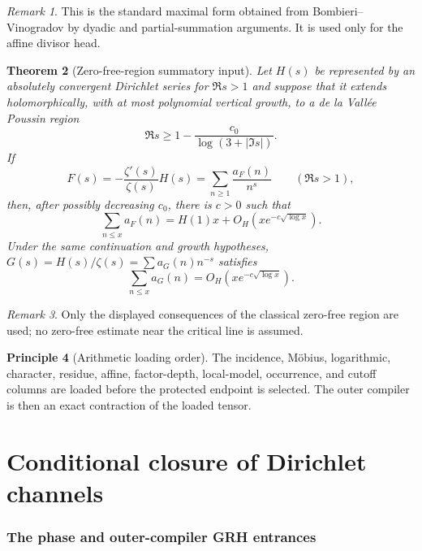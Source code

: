 \documentclass[11pt]{article}
\newtheorem{theorem}{Theorem}[section]
\theoremstyle{definition}
\newtheorem{principle}[theorem]{Principle}
\theoremstyle{remark}
\newtheorem{remark}[theorem]{Remark}
\begin{document}
\begin{remark}
This is the standard maximal form obtained from Bombieri--Vinogradov \cite{Bombieri1965,Vinogradov,IK} by dyadic
and partial-summation arguments.  It is used only for the affine divisor head.
\end{remark}

\begin{theorem}[Zero-free-region summatory input]
\label{thm:zero-free-input}
Let $H(s)$ be represented by an absolutely convergent Dirichlet series for
$\Re s>1$ and suppose that it extends holomorphically, with at most polynomial
vertical growth, to a de la Vall\'ee Poussin region
\[
 \Re s\ge 1-\frac{c_0}{\log(3+|\Im s|)}.
\]
If
\[
 F(s)=-\frac{\zeta'(s)}{\zeta(s)}H(s)
      =\sum_{n\ge1}\frac{a_F(n)}{n^s}
 \qquad(\Re s>1),
\]
then, after possibly decreasing $c_0$, there is $c>0$ such that
\[
 \sum_{n\le x}a_F(n)
 =H(1)x+O_H\!\left(xe^{-c\sqrt{\log x}}\right).
\]
Under the same continuation and growth hypotheses,
$G(s)=H(s)/\zeta(s)=\sum a_G(n)n^{-s}$ satisfies
\[
 \sum_{n\le x}a_G(n)
 =O_H\!\left(xe^{-c\sqrt{\log x}}\right).
\]
\end{theorem}

\begin{remark}
Only the displayed consequences of the classical zero-free region \cite{Davenport,MV} are used;
no zero-free estimate near the critical line is assumed.
\end{remark}

\begin{principle}[Arithmetic loading order]
The incidence, M\"obius, logarithmic, character, residue, affine, factor-depth,
local-model, occurrence, and cutoff columns are loaded before the protected
endpoint is selected.  The outer compiler is then an exact contraction of the
loaded tensor.
\end{principle}


\part{Conditional closure of Dirichlet channels}

\section{The phase and outer-compiler GRH entrances}
\label{sec:grh-entrance}
\end{document}
